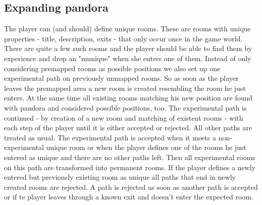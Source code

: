 \documentclass[11pt]{article}
\begin{document}
\subsection{Expanding pandora}
The player can (and should) define unique rooms. These are rooms with unique properties - title,
description, exits - that only occur once in the game world. There are quite a few such rooms and the
player should be able to find them by experience and drop an "munique" when she enters one of them.
Instead of only considering premapped rooms as possible positions we also set up one experimental
path on previously unmapped rooms. So as soon as the player leaves the premapped area a new room is
created resembling the room he just enters. At the same time all existing rooms matching his new
position are found with pandora and considered possible positions, too. The experimental path is
continued - by creation of a new room and matching of existent rooms - with each step of the player
until it is either accepted or rejected. All other paths are treated as usual. The experimental path
is accepted when it meets a non-experimental unique room or when the player defines one of the rooms
he just entered as unique and there are no other paths left. Then all experimental rooms on this path
are transformed into permanent rooms. If the player defines a newly entered
but previously existing room as unique all paths that end in newly created rooms are rejected. A
path is rejected as soon as another path is accepted or if te player leaves through a known
exit and doesn't enter the expected room.
\end{document}
